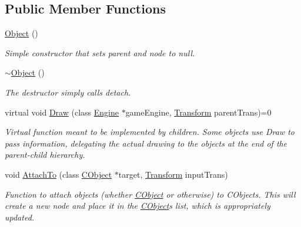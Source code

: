 \subsection*{Public Member Functions}
\begin{DoxyCompactItemize}
\item 
\hypertarget{class_object_a40860402e64d8008fb42329df7097cdb}{}\label{class_object_a40860402e64d8008fb42329df7097cdb} 
\hyperlink{class_object_a40860402e64d8008fb42329df7097cdb}{Object} ()
\begin{DoxyCompactList}\small\item\em Simple constructor that sets parent and node to null. \end{DoxyCompactList}\item 
\hypertarget{class_object_ae8f5483f459e46687bd01e6f9977afd3}{}\label{class_object_ae8f5483f459e46687bd01e6f9977afd3} 
\hyperlink{class_object_ae8f5483f459e46687bd01e6f9977afd3}{$\sim$\+Object} ()
\begin{DoxyCompactList}\small\item\em The destructor simply calls detach. \end{DoxyCompactList}\item 
virtual void \hyperlink{class_object_adeb7a19aaca51dbf093b37fd21c5e41f}{Draw} (class \hyperlink{class_engine}{Engine} $\ast$game\+Engine, \hyperlink{class_transform}{Transform} parent\+Trans)=0
\begin{DoxyCompactList}\small\item\em Virtual function meant to be implemented by children. Some objects use Draw to pass information, delegating the actual drawing to the objects at the end of the parent-\/child hierarchy. \end{DoxyCompactList}\item 
void \hyperlink{class_object_ab0d9f0a189f0587d672cc21008b2be76}{Attach\+To} (class \hyperlink{class_c_object}{C\+Object} $\ast$target, \hyperlink{class_transform}{Transform} input\+Trans)
\begin{DoxyCompactList}\small\item\em Function to attach objects (whether \hyperlink{class_c_object}{C\+Object} or otherwise) to C\+Objects. This will create a new node and place it in the \hyperlink{class_c_object}{C\+Object}\textquotesingle{}s list, which is appropriately updated. \end{DoxyCompactList}\item 
\hypertarget{class_object_ad818b7d495bf99bedcabfdf0f37774ac}{}\label{class_object_ad818b7d495bf99bedcabfdf0f37774ac} 

\end{DoxyCompactItemize}
